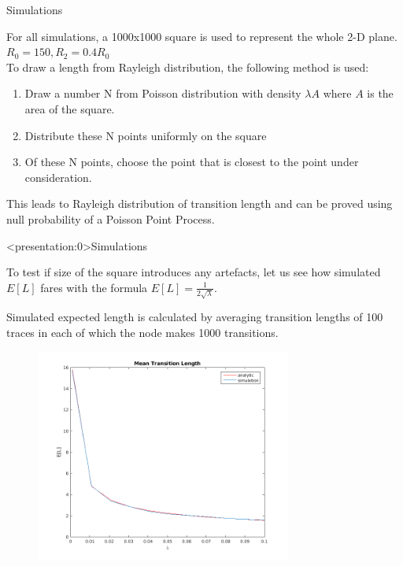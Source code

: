 \documentclass{beamer}
\begin{document}
\begin{frame}{Simulations} {}

For all simulations, a 1000x1000 square is used to represent the whole 2-D plane. 
$R_0 = 150, R_2 = 0.4R_0$ \\
To draw a length from Rayleigh distribution, the following method is used:

\begin{enumerate}
	\item Draw a number N from Poisson distribution with density $\lambda A$ where $A$ is the area of the square.
	\item Distribute these N points uniformly on the square 
	\item Of these N points, choose the point that is closest to the point under consideration. 
\end{enumerate}

This leads to Rayleigh distribution of transition length and can be proved using null probability of a Poisson Point Process. 

\end{frame}


\begin{frame}<presentation:0>{Simulations}

To test if size of the square introduces any artefacts, let us see how simulated $E[L]$ fares with the formula $E[L] = \frac{1}{2\sqrt{\lambda}}$. 

Simulated expected length is calculated by averaging transition lengths of 100 traces in each of which the node makes 1000 transitions. 
\begin{figure}[h]
	\centering \vspace{-0.1in}
	\includegraphics[width=0.75\textwidth]{images/rwpStat.png}
\end{figure}

\end{frame}
\end{document}
